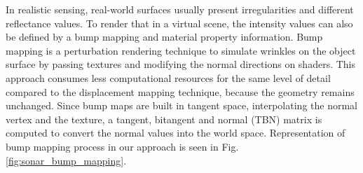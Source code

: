 \documentclass[final,5p,times]{elsarticle}
\begin{document}
In realistic sensing, real-world surfaces usually present irregularities and different reflectance values. To render that in a virtual scene, the intensity values can also be defined by a bump mapping and material property information. Bump mapping is a perturbation rendering technique to simulate wrinkles on the object surface by passing textures and modifying the normal directions on shaders. This approach consumes less computational resources for the same level of detail compared to the displacement mapping technique, because the geometry remains unchanged. Since bump maps are built in tangent space, interpolating the normal vertex and the texture, a tangent, bitangent and normal (TBN) matrix is computed to convert the normal values into the world space. Representation of bump mapping process in our approach is seen in Fig. \ref{fig:sonar_bump_mapping}.
\end{document}
